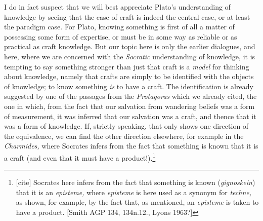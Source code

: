 \documentclass[11pt]{amsart}
\begin{document}
I do in fact suspect that we will best appreciate Plato's
understanding of knowledge by seeing that the case of craft is indeed
the central case, or at least the paradigm case. For Plato, knowing
something is first of all a matter of possessing some form of
expertise, or must be in some way as reliable or as practical as craft
knowledge. But our topic here is only the earlier dialogues, and here,
where we are concerned with the \emph{Socratic} understanding of
knowledge, it is tempting to say something stronger than just that
craft is a \emph{model} for thinking about knowledge, namely that
crafts are simply to be identified with the objects of knowledge; to
know something \emph{is} to have a craft. The identification is
already suggested by one of the passages from the \emph{Protagoras}
which we already cited, the one in which, from the fact that our
salvation from wandering beliefs was a form of measurement, it was
inferred that our salvation was a craft, and thence that it was a form
of knowledge. If, strictly speaking, that only shows one direction of
the equivalence, we can find the other direction elsewhere, for
example in the \emph{Charmides,} where Socrates infers from the fact
that something is known that it is a craft (and even that it must have
a product!).\footnote{[cite] Socrates here infers from the fact that
something is known (\emph{gignoskein}) that it is an \emph{episteme,}
where \emph{episteme} is here used as a synonym for \emph{techne,} as
shown, for example, by the fact that, as mentioned, an \emph{episteme}
is taken to have a product. [Smith AGP 134, 134n.12., Lyons 1963?]}\\
\end{document}
